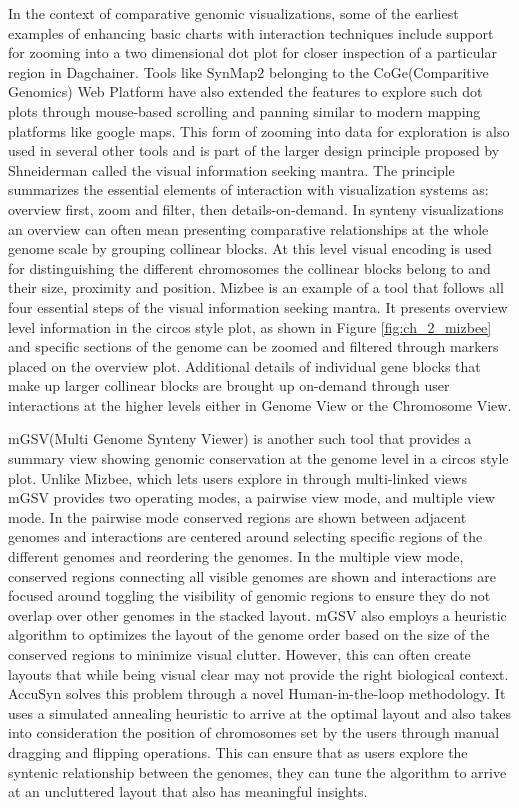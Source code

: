 In the context of comparative genomic visualizations, some of the earliest examples of enhancing basic charts with interaction techniques include support for zooming into a two dimensional dot plot for closer inspection of a particular region in Dagchainer\cite{haas2004dagchainer}. Tools like SynMap2\cite{haug2017synmap2} belonging to the CoGe(Comparitive Genomics)\cite{coge} Web Platform have also extended the features to explore such dot plots through mouse-based scrolling and panning similar to modern mapping platforms like google maps. This form of zooming into data for exploration is also used in several other tools and is part of the larger design principle proposed by Shneiderman\cite{Shneiderman96theeyes} called the visual information seeking mantra. The principle summarizes the essential elements of interaction with visualization systems as: overview first, zoom and filter, then details-on-demand. In synteny visualizations an overview can often mean presenting comparative relationships at the whole genome scale by grouping collinear blocks. At this level visual encoding is used for distinguishing the different chromosomes the collinear blocks belong to and their size, proximity and position. Mizbee is an example of a tool that follows all four essential steps of the visual information seeking mantra\cite{Meyer2009}. It presents overview level information in the circos style plot, as shown in Figure \ref{fig:ch_2_mizbee} and specific sections of the genome can be zoomed and filtered through markers placed on the overview plot. Additional details of individual gene blocks that make up larger collinear blocks are brought up on-demand through user interactions at the higher levels either in Genome View or the  Chromosome View. 

mGSV(Multi Genome Synteny Viewer) is another such tool that provides a summary view showing genomic conservation at the genome level in a circos style plot\cite{revanna2011gsv}. Unlike Mizbee, which lets users explore in through multi-linked views mGSV provides two operating modes, a pairwise view mode, and multiple view mode. In the pairwise mode conserved regions are shown between adjacent genomes and interactions are centered around selecting specific regions of the different genomes and reordering the genomes. In the multiple view mode, conserved regions connecting all visible genomes are shown and interactions are focused around toggling the visibility of genomic regions to ensure they do not overlap over other genomes in the stacked layout. mGSV also employs a heuristic algorithm to optimizes the layout of the genome order based on the size of the conserved regions to minimize visual clutter. However, this 
can often create layouts that while being visual clear may not provide the right biological context. AccuSyn solves this problem through a novel Human-in-the-loop methodology\cite{accusyn}. It uses a simulated annealing heuristic to arrive at the optimal layout and also takes into consideration the position of chromosomes set by the users through manual dragging and flipping operations. This can ensure that as users explore the syntenic relationship between the genomes, they can tune the algorithm to arrive at an uncluttered layout that also has meaningful insights.

